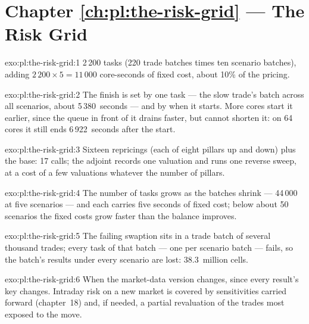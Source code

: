 \section*{Chapter \ref{ch:pl:the-risk-grid} --- The Risk Grid}

\begin{solution}{exo:pl:the-risk-grid:1}
2\,200 tasks (220 trade batches times ten scenario batches), adding $2\,200 \times 5 = 11\,000$ core-seconds of fixed cost, about 10\% of the
pricing.
\end{solution}

\begin{solution}{exo:pl:the-risk-grid:2}
The finish is set by one task --- the slow trade's batch across all scenarios, about 5\,380~seconds --- and by when it starts. More cores
start it earlier, since the queue in front of it drains faster, but cannot shorten it: on 64 cores it still ends 6\,922~seconds after the
start.
\end{solution}

\begin{solution}{exo:pl:the-risk-grid:3}
Sixteen repricings (each of eight pillars up and down) plus the base: 17 calls; the adjoint records one valuation and runs one reverse sweep,
at a cost of a few valuations whatever the number of pillars.
\end{solution}

\begin{solution}{exo:pl:the-risk-grid:4}
The number of tasks grows as the batches shrink --- 44\,000 at five scenarios --- and each carries five seconds of fixed cost; below about 50
scenarios the fixed costs grow faster than the balance improves.
\end{solution}

\begin{solution}{exo:pl:the-risk-grid:5}
The failing swaption sits in a trade batch of several thousand trades; every task of that batch --- one per scenario batch --- fails, so the
batch's results under every scenario are lost: 38.3~million cells.
\end{solution}

\begin{solution}{exo:pl:the-risk-grid:6}
When the market-data version changes, since every result's key changes. Intraday risk on a new market is covered by sensitivities carried
forward (chapter~18) and, if needed, a partial revaluation of the trades most exposed to the move.
\end{solution}

